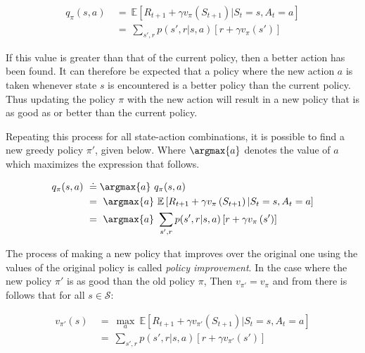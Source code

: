 \begin{equation}
  \begin{aligned}
    q_\pi(s, a) \ &=\ \mathbb{E} \left [ R_{t+1} + \gamma v_\pi \left ( S_{t+1}  \right ) | S_t=s, A_t=a \right ] \\
        &=\ \sum_{s', r} p(s',r|s,a) \left [ r + \gamma v_\pi \left ( s'  \right ) \right ]
  \end{aligned}
\end{equation}

If this value is greater than that of the current policy, then a better action has been found.
It can therefore be expected that a policy where the new action $a$ is taken whenever state $s$ is encountered is a better policy than the current policy.
Thus updating the policy $\pi$ with the new action will result in a new policy that is as good as or better than the current policy.

Repeating this process for all state-action combinations, it is possible to find a new greedy policy $\pi'$, given below.
Where $\argmax{a}$ denotes the value of $a$ which maximizes the expression that follows.

\begin{equation}
  \begin{aligned}
    q_\pi(s, a) \ &\doteq \argmax{a}\ q_\pi(s, a) \\
                  &=\ \argmax{a}\ \mathbb{E} \left [ R_{t+1} + \gamma v_\pi \left ( S_{t+1}  \right ) | S_t=s, A_t=a \right ] \\
        &=\ \argmax{a}\ \sum_{s', r} p(s',r|s,a) \left [ r + \gamma v_\pi \left ( s'  \right ) \right ]
  \end{aligned}
\end{equation}


The process of making a new policy that improves over the original one using the values of the original policy is called \emph{policy improvement}.
In the case where the new policy $\pi'$ is as good than the old policy $\pi$, Then $v_{\pi'}=v_{\pi}$ and from there is follows that for all $s \in \mathcal{S}$:

\begin{equation}
  \begin{aligned}
    v_{\pi'}(s) \ &=\ \max_{a}\ \mathbb{E} \left [ R_{t+1} + \gamma v_{\pi'}(S_{t+1}) | S_t=s, A_t=a \right ] \\
             &=\ \sum_{s', r} p(s',r|s,a) \left [ r+\gamma v_{\pi'}(s') \right ]
\end{aligned}
\end{equation}

